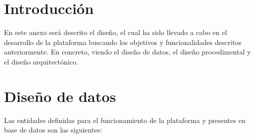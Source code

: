 
\section{Introducción}
En este anexo será descrito el diseño, el cual ha sido llevado a cabo en el desarrollo de la plataforma buscando los objetivos y funcionalidades descritos anteriormente. En concreto, viendo el diseño de datos, el diseño procedimental y el diseño arquitectónico.

\section{Diseño de datos}
Las entidades definidas para el funcionamiento de la plataforma y presentes en base de datos son las siguientes:

